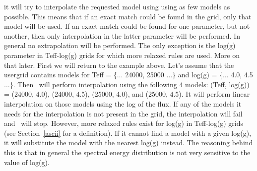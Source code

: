\noindent
it will try to interpolate the requested model using using as few models as
possible. This means that if an exact match could be found in the grid, only
that model will be used. If an exact match could be found for one parameter,
but not another, then only interpolation in the latter parameter will be
performed. In general no extrapolation will be performed. The only exception
is the log(g) parameter in Teff-log(g) grids for which more relaxed rules are
used. More on that later. First we will return to the example above. Let's
assume that the usergrid contains models for Teff = \{$\ldots$ 24000, 25000
$\ldots$\} and log(g) = \{$\ldots$ 4.0, 4.5 $\ldots$\}. Then \Cloudy\ will
perform interpolation using the following 4 models: (Teff, log(g)) = (24000,
4.0), (24000, 4.5), (25000, 4.0), and (25000, 4.5). It will perform linear
interpolation on those models using the log of the flux. If any of the models
it needs for the interpolation is not present in the grid, the interpolation
will fail and \Cloudy\ will stop. However, more relaxed rules exist for log(g)
in Teff-log(g) grids (see Section~\ref{ascii} for a definition). If it cannot
find a model with a given log(g), it will substitute the model with the
nearest log(g) instead. The reasoning behind this is that in general the
spectral energy distribution is not very sensitive to the value of log(g).
